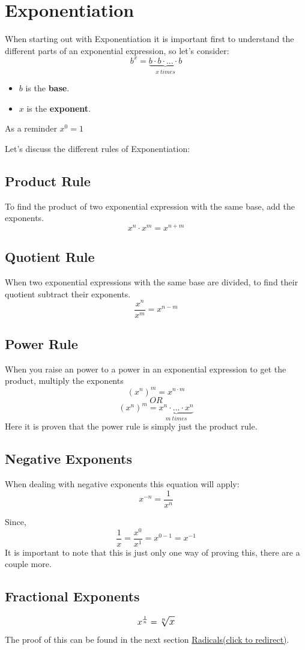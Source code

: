 \section{Exponentiation}
When starting out with Exponentiation it is important first to understand the different parts of an exponential expression, so let's consider:
$$b^x = \underbrace{b \cdot b \cdot ... \cdot b}_{x \ times}$$
\begin{itemize}
  \item $b$ is the \textbf{base}.
  \item $x$ is the \textbf{exponent}.
\end{itemize}

As a reminder $ x^0 = 1 $

Let's discuss the different rules of Exponentiation:
\subsection{Product Rule}
To find the product of two exponential expression with the same base, add the exponents. 
$$ x^{n} \cdot x^{m} = x^{n+m} $$

\subsection{Quotient Rule}
When two exponential expressions with the same base are divided,  to find their quotient subtract their exponents. 
$$ \frac{x^n}{x^m} = x^{n-m} $$

\subsection{Power Rule}
When you raise an power to a power in an exponential expression to get the product, multiply the exponents
$$ (x^{n})^{m} = x^{n \cdot m} $$ 
$$ OR $$
$$ (x^{n})^{m} = \underbrace{x^n \cdot ... \cdot x^n}_{m \ times} $$
Here it is proven that the power rule is simply just the product rule.

\subsection{Negative Exponents}
When dealing with negative exponents this equation will apply: 
$$ x^{-n} = \frac{1}{x^n} $$

Since, 
$$ \frac{1}{x} = \frac{x^0}{x^1} = x^{0-1} = x^{-1} $$
It is important to note that this is just only one way of proving this, there are a couple more. 

\subsection{Fractional Exponents}
$$ \large x^{\frac{1}{n}} = \sqrt[n]{x} $$
The proof of this can be found in the next section \hyperref[sec:radicals]{Radicals(click to redirect)}.

